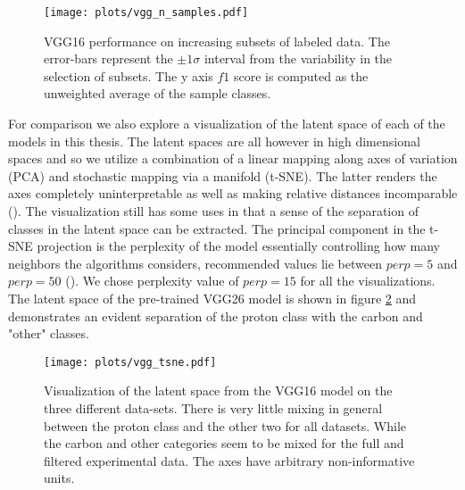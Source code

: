 \begin{figure}
\texttt{[image: plots/vgg\_n\_samples.pdf]}
\caption[VGG16 performance on labeled subsets]{VGG16 performance on increasing subsets of labeled data. The error-bars represent the $\pm 1\sigma$ interval from the variability in the selection of subsets. The y axis $f1$ score is computed as the unweighted average of the sample classes. }\label{fig:vgg_n_samples}
\end{figure}

For comparison we also explore a visualization of the latent space of each of the models in this thesis. The latent spaces are all however in high dimensional spaces and so we utilize a combination of a linear mapping along axes of variation (PCA) and stochastic mapping via a manifold (t-SNE). The latter renders the axes completely uninterpretable as well as making relative distances incomparable (\cite{VanDerMaaten2008}). The visualization still has some uses in that a sense of the separation of classes in the latent space can be extracted. The principal component in the t-SNE projection is the perplexity of the model essentially controlling how many neighbors the algorithms considers, recommended values lie between $perp=5$ and $perp=50$ (\cite{VanDerMaaten2008}). We chose perplexity value of $perp=15$ for all the visualizations. The latent space of the pre-trained VGG26 model is shown in figure \ref{fig:vgg_tsne} and demonstrates an evident separation of the proton class with the carbon and "other" classes. 

\begin{figure}
\centering
\texttt{[image: plots/vgg\_tsne.pdf]}
\caption[VGG16 latent visualization]{Visualization of the latent space from the VGG16 model on the three different data-sets. There is very little mixing in general between the proton class and the other two for all datasets. While the carbon and other categories seem to be mixed for the full and filtered experimental data. The axes have arbitrary non-informative units.}\label{fig:vgg_tsne}
\end{figure}